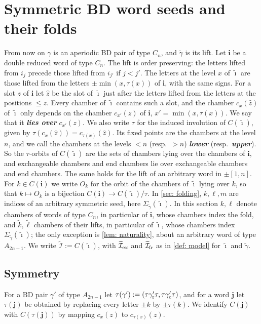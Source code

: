 \documentclass[a4paper]{amsart}
\numberwithin{equation}{section}
\theoremstyle{definition}
\theoremstyle{remark}
\newcommand{\mcI}{\mathcal{I}}
\newcommand{\bfi}{\mathbf{i}}
\newcommand{\tbfi}{\widetilde{\boldsymbol{\imath}}}
\newcommand{\bfj}{\mathbf{j}}
\newcommand{\tg}{\widetilde{\gamma}}
\newcommand{\rr}{{\rm r}}
\newcommand{\cc}{{\rm c}}
\newcommand{\ex}{{\rm ex}}
\newcommand{\fr}{{\rm fr}}
\newcommand{\newword}[1]{\textbf{\emph{#1}}}
\begin{document}
\section{Symmetric BD word seeds and their folds}
\label{sec: symmetric}
From now on $\gamma$ is an aperiodic BD pair of type $C_n$, and $\tg$ is its lift.
Let $\bfi$ be a double reduced word of type $C_n$.
The lift is order preserving: the letters lifted from $i_j$ precede those lifted from $i_{j'}$ if $j<j'$.
  The letters at the level $x$ of $\tbfi$ are those lifted from the letters $\pm\min(x,\tau(x))$ of $\bfi$, with the same signs.
For a slot $z$ of $\bfi$ let $\widehat z$ be the slot of $\tbfi$ just after the letters lifted from the letters at the positions $\le z$.
Every chamber of $\tbfi$ contains such a slot, and the chamber $c_x(\widehat z)$ of $\tbfi$ only depends on the chamber $c_{x'}(z)$ of $\bfi$, $x'=\min(x,\tau(x))$. We say that it \newword{lies over} $c_{x'}(z)$.
We also write $\tau$ for the induced involution of $C(\tbfi)$, given by $\tau(c_x(\widehat z))=c_{\tau(x)}(\widehat z)$.
  Its fixed points are the chambers at the level $n$, and we call the chambers at the levels $<n$ (resp.\ $>n$) \newword{lower} (resp.\ \newword{upper}).
So the $\tau$-orbits of $C(\tbfi)$ are the sets of chambers lying over the chambers of $\bfi$, and exchangeable chambers and end chambers lie over exchangeable chambers and end chambers.
The same holds for the lift of an arbitrary word in $\pm[1,n]$.
For $k\in C(\bfi)$ we write $O_k$ for the orbit of the chambers of $\tbfi$ lying over $k$, so that $k\mapsto O_k$ is a bijection $C(\bfi)\to C(\tbfi)/\tau$.
In \cref{sec: folding}, $k,\ell,m$ are indices of an arbitrary symmetric seed, here $\Sigma_{\tg}(\tbfi)$. In this section $k,\ell$ denote chambers of words of type $C_n$, in particular of $\bfi$, whose chambers index the fold, and $\widetilde{k},\widetilde{\ell}$ chambers of their lifts, in particular of $\tbfi$, whose chambers index $\Sigma_{\tg}(\tbfi)$; the only exception is \cref{lem: naturality}, about an arbitrary word of type $A_{2n-1}$.
We write $\widetilde{\mcI}:=C(\tbfi)$, with $\widetilde{\mcI}_\ex$ and $\widetilde{\mcI}_\fr$ as in \cref{def: model} for $\tbfi$ and $\tg$.

\subsection{Symmetry}
For a BD pair $\gamma'$ of type $A_{2n-1}$ let $\tau(\gamma'):=(\tau\gamma'_{\rr}\tau,\tau\gamma'_{\cc}\tau)$, and for a word $\bfj$ let $\tau(\bfj)$ be obtained by replacing every letter $\pm k$ by $\pm\tau(k)$.
  We identify $C(\bfj)$ with $C(\tau(\bfj))$ by mapping $c_x(z)$ to $c_{\tau(x)}(z)$.
\end{document}
